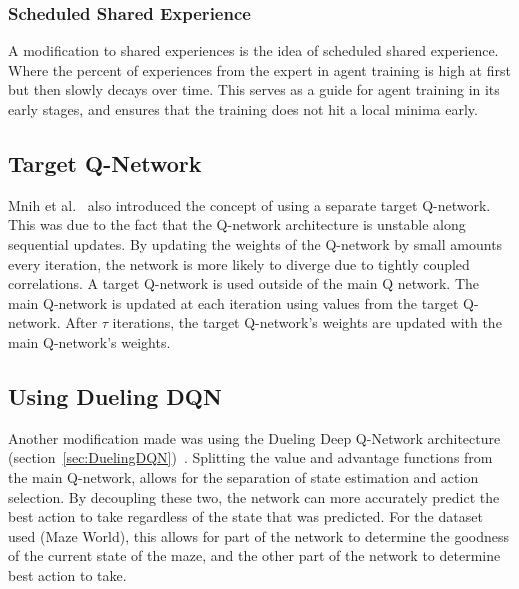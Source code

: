 \documentclass[12pt,american]{report}
\providecommand{\DIFaddtex}[1]{{\protect\color{blue}\uwave{#1}}} %
\providecommand{\DIFaddbegin}{} %
\providecommand{\DIFaddend}{} %
\providecommand{\DIFadd}[1]{\texorpdfstring{\DIFaddtex{#1}}{#1}} %
\newcommand{\DIFaddincludegraphics}[2][]{{\color{blue}\fbox{\DIFOincludegraphics[#1]{#2}}}} %
\DeclareRobustCommand{\DIFaddbegin}{\DIFOaddbegin \let\includegraphics\DIFaddincludegraphics} %
\DeclareRobustCommand{\DIFaddend}{\DIFOaddend \let\includegraphics\DIFOincludegraphics} %
\begin{document}
\subsubsection{Scheduled Shared Experience \DIFaddbegin \DIFadd{Replay}\DIFaddend }
A modification to shared experiences is the idea of scheduled shared experience.  Where the percent of experiences from the expert in agent training is high at first but then slowly decays over time.  This serves as a guide for agent training in its early stages, and ensures that the training does not hit a local minima early. 


\subsection{Target Q-Network}
Mnih et al.~\cite{atari} also introduced the concept of using a separate target Q-network.  This was due to the fact that the Q-network architecture is unstable along sequential updates.  By updating the weights of the Q-network by small amounts every iteration, the network is more likely to diverge due to tightly coupled correlations.  A target Q-network is used outside of the main Q network.  The main Q-network is updated at each iteration using values from the target Q-network.  After $\tau$ iterations, the target Q-network's weights are updated with the main Q-network's weights. 
\DIFaddbegin 

\DIFaddend \subsection{Using Dueling DQN}
Another modification made was using the Dueling Deep Q-Network architecture (section~\ref{sec:DuelingDQN})~\cite{wang2015dueling}.  Splitting the value and advantage functions from the main Q-network, allows for the separation of state estimation and action selection.  By decoupling these two, the network can more accurately predict the best action to take regardless of the state that was predicted. For the dataset used (Maze World), this allows for part of the network to determine the goodness of the current state of the maze, and the other part of the network to determine best action to take. 
\end{document}
